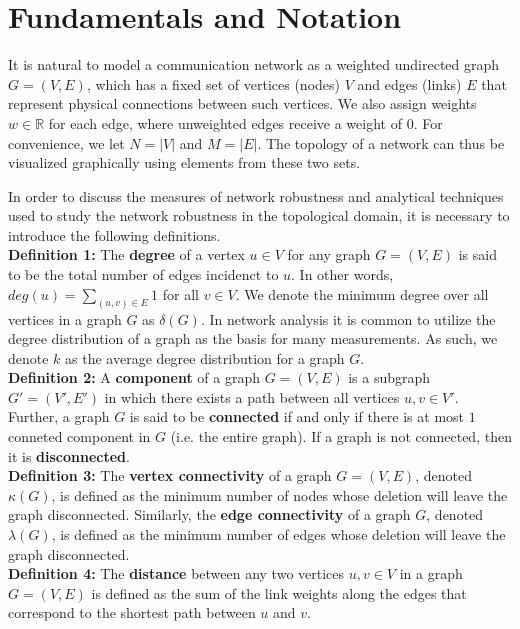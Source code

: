 \documentclass[doc]{apa}%
\begin{document}
\section{Fundamentals and Notation}
\label{Definitions}

It is natural to model a communication network as a weighted undirected graph $G = (V,E)$, which has a fixed set of vertices (nodes) $V$ and edges (links) $E$ that represent physical connections between such vertices. We also assign weights $w \in \mathbb{R}$ for each edge, where unweighted edges receive a weight of $0$. For convenience, we let $N = |V|$ and $M = |E|$. The topology of a network can thus be visualized graphically using elements from these two sets. 

In order to discuss the measures of network robustness and analytical techniques used to study the network robustness in the topological domain, it is necessary to introduce the following definitions. \\

\textbf{Definition 1:}
The \textbf{degree} of a vertex $u \in V$ for any graph $G = (V,E)$ is said to be the total number of edges incidenct to $u$. In other words, $deg(u) = \sum_{(u,v) \in E} 1$ for all $v \in V$. We denote the minimum degree over all vertices in a graph $G$ as $\delta(G)$. In network analysis it is common to utilize the degree distribution of a graph as the basis for many measurements. As such, we denote $k$ as the average degree distribution for a graph $G$.\\

\textbf{Definition 2:}
A \textbf{component} of a graph $G = (V,E)$ is a subgraph $G' = (V',E')$ in which there exists a path between all vertices $u, v \in V'$. Further, a graph $G$ is said to be \textbf{connected} if and only if there is at most $1$ conneted component in $G$ (i.e. the entire graph). If a graph is not connected, then it is \textbf{disconnected}.\\

\textbf{Definition 3:}
The \textbf{vertex connectivity} of a graph $G = (V,E)$, denoted $\kappa(G)$, is defined as the minimum number of nodes whose deletion will leave the graph disconnected. Similarly, the \textbf{edge connectivity} of a graph $G$, denoted $\lambda(G)$, is defined as the minimum number of edges whose deletion will leave the graph disconnected.\\

\textbf{Definition 4:}
The \textbf{distance} between any two vertices $u, v \in V$ in a graph $G = (V,E)$ is defined as the sum of the link weights along the edges that correspond to the shortest path between $u$ and $v$.
\end{document}
